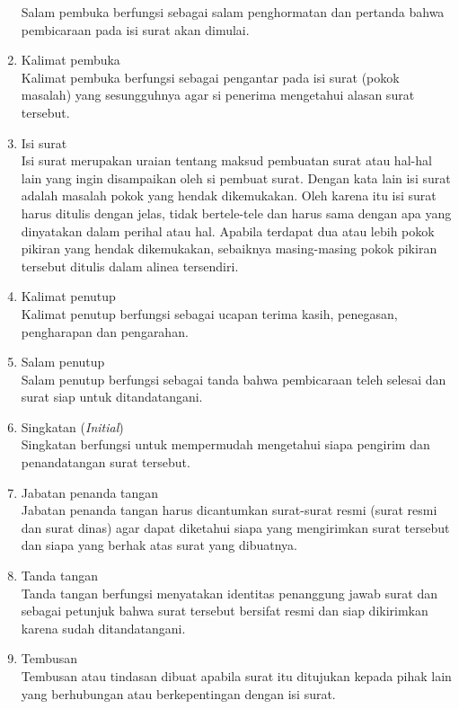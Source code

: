 \begin{enumerate}
	Salam pembuka berfungsi sebagai salam penghormatan dan pertanda bahwa pembicaraan pada isi surat akan dimulai.
	\item Kalimat pembuka\\
	Kalimat pembuka berfungsi sebagai pengantar pada isi surat (pokok masalah) yang sesungguhnya agar si penerima mengetahui alasan surat tersebut.
	\item Isi surat\\
	Isi surat merupakan uraian tentang maksud pembuatan surat atau hal-hal lain yang ingin disampaikan oleh si pembuat surat. Dengan kata lain isi surat adalah masalah pokok yang hendak dikemukakan. Oleh karena itu isi surat harus ditulis dengan jelas, tidak bertele-tele dan harus sama dengan apa yang dinyatakan dalam perihal atau hal.
	Apabila terdapat dua atau lebih pokok pikiran yang hendak dikemukakan, sebaiknya masing-masing pokok pikiran tersebut ditulis dalam alinea tersendiri.
	\item Kalimat penutup\\
	Kalimat penutup berfungsi sebagai ucapan terima kasih, penegasan, pengharapan dan pengarahan. 
	\item Salam penutup\\
	Salam penutup berfungsi sebagai tanda bahwa pembicaraan teleh selesai dan surat siap untuk ditandatangani.
	\item Singkatan (\textit{Initial})\\
	Singkatan berfungsi untuk mempermudah mengetahui siapa pengirim dan penandatangan surat tersebut.
	\item Jabatan penanda tangan\\
	Jabatan penanda tangan harus dicantumkan surat-surat resmi (surat resmi dan surat dinas) agar dapat diketahui siapa yang mengirimkan surat tersebut dan siapa yang berhak atas surat yang dibuatnya.
	\item Tanda tangan\\
	Tanda tangan berfungsi menyatakan identitas penanggung jawab surat dan sebagai petunjuk bahwa surat tersebut bersifat resmi dan siap dikirimkan karena sudah ditandatangani.
	\item Tembusan\\
	Tembusan atau tindasan dibuat apabila surat itu ditujukan kepada pihak lain yang berhubungan atau berkepentingan dengan isi surat.
\end{enumerate}


